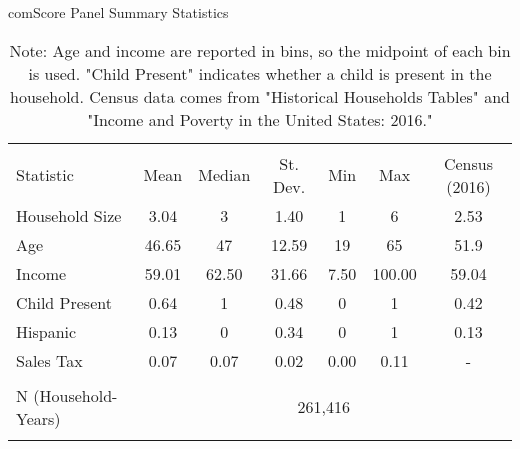 
\begin{table}[!htbp] \centering
  \caption{comScore Panel Summary Statistics}
  \label{tab:comScorePanel}
\begin{tabular}{@{\extracolsep{5pt}}lccccc|c}
\\[-1.8ex]\hline
\hline \\[-1.8ex]
Statistic & \multicolumn{1}{c}{Mean} & \multicolumn{1}{c}{Median} & \multicolumn{1}{c}{St. Dev.} & \multicolumn{1}{c}{Min} & \multicolumn{1}{c}{Max} & Census (2016) \\
\hline
Household Size  & 3.04  & 3     & 1.40  & 1     & 6       & 2.53 \\
Age             & 46.65 & 47    & 12.59 & 19    & 65      & 51.9\\
Income          & 59.01 & 62.50 & 31.66 & 7.50  & 100.00  & 59.04 \\
Child Present   & 0.64  & 1     & 0.48  & 0     & 1       & 0.42 \\
Hispanic        & 0.13  & 0     & 0.34  & 0     & 1       & 0.13\\
Sales Tax       & 0.07  & 0.07  & 0.02  & 0.00  & 0.11    & - \\
\hline \\[-1.8ex]
N (Household-Years) & \multicolumn{6}{c}{261,416} \\
\hline \\[-1.8ex]
\end{tabular}
\caption*{Note: Age and income are reported in bins, so the midpoint of each bin is used. "Child Present" indicates whether a child is present in the household. Census data comes from "Historical Households Tables" and "Income and Poverty in the United States: 2016."}
\end{table}
